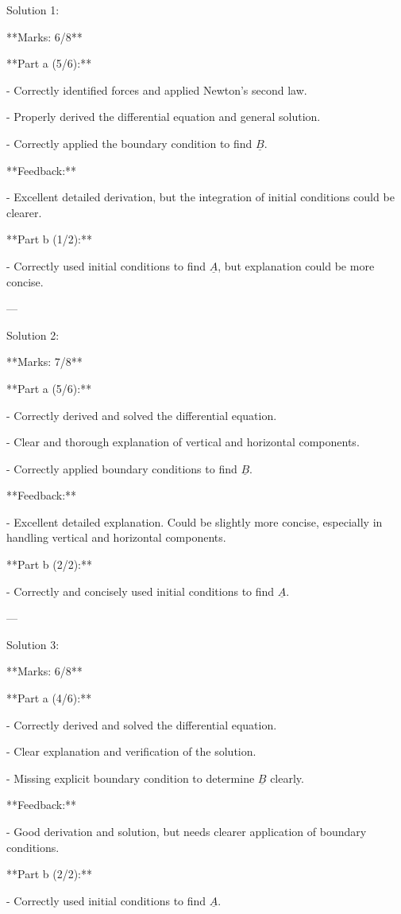 \documentclass[a4paper,11pt]{article}
\begin{document}
Solution 1:

**Marks: 6/8**

**Part a (5/6):** 

- Correctly identified forces and applied Newton's second law.

- Properly derived the differential equation and general solution.

- Correctly applied the boundary condition to find \(\underline{B}\).

**Feedback:**

- Excellent detailed derivation, but the integration of initial conditions could be clearer.

**Part b (1/2):**

- Correctly used initial conditions to find \(\underline{A}\), but explanation could be more concise.

---

Solution 2:

**Marks: 7/8**

**Part a (5/6):** 

- Correctly derived and solved the differential equation.

- Clear and thorough explanation of vertical and horizontal components.

- Correctly applied boundary conditions to find \(\underline{B}\).

**Feedback:**

- Excellent detailed explanation. Could be slightly more concise, especially in handling vertical and horizontal components.

**Part b (2/2):**

- Correctly and concisely used initial conditions to find \(\underline{A}\).

---

Solution 3:

**Marks: 6/8**

**Part a (4/6):**

- Correctly derived and solved the differential equation.

- Clear explanation and verification of the solution.

- Missing explicit boundary condition to determine \(\underline{B}\) clearly.

**Feedback:**

- Good derivation and solution, but needs clearer application of boundary conditions.

**Part b (2/2):**

- Correctly used initial conditions to find \(\underline{A}\).
\end{document}
